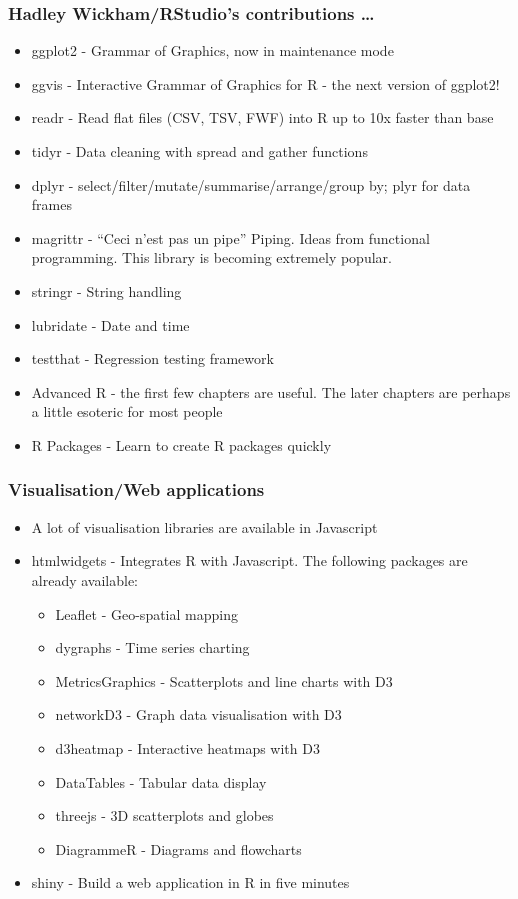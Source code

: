 \documentclass{beamer}
\begin{document}
\begin{frame}
\frametitle{Hadley Wickham/RStudio's contributions \ldots}
\begin{itemize}
\item ggplot2 - Grammar of Graphics, now in maintenance mode
\item ggvis - Interactive Grammar of Graphics for R - the next version of ggplot2!
\item readr - Read flat files (CSV, TSV, FWF) into R up to 10x faster than base
\item tidyr - Data cleaning with spread and gather functions
\item dplyr - select/filter/mutate/summarise/arrange/group by; plyr for data frames
\item magrittr - ``Ceci n'est pas un pipe'' Piping. Ideas from functional programming.
			This library is becoming extremely popular.
\item stringr - String handling
\item lubridate - Date and time
\item testthat - Regression testing framework
\item Advanced R - the first few chapters are useful. The later chapters are perhaps a little
			esoteric for most people
\item R Packages - Learn to create R packages quickly
\end{itemize}
\end{frame}

\begin{frame}
\frametitle{Visualisation/Web applications}
\begin{itemize}
\item A lot of visualisation libraries are available in Javascript
\item htmlwidgets - Integrates R with Javascript. The following packages are already
			available:
			\begin{itemize}
			\item Leaflet - Geo-spatial mapping
			\item dygraphs - Time series charting
			\item MetricsGraphics - Scatterplots and line charts with D3
			\item networkD3 - Graph data visualisation with D3
			\item d3heatmap - Interactive heatmaps with D3
			\item DataTables - Tabular data display
			\item threejs - 3D scatterplots and globes
			\item DiagrammeR - Diagrams and flowcharts
			\end{itemize}
\item shiny - Build a web application in R in five minutes
\end{itemize}
\end{frame}
\end{document}

